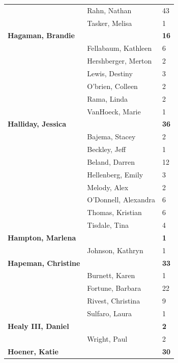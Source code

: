 \documentclass{article}\usepackage[]{graphicx}\usepackage[]{color}
\begin{document}
{\begin{longtable} { >{\raggedright}p{}|p{}p{}}
   \rowcolor[gray]{0.90} & Rahn, Nathan & 43 \\ 
   & Tasker, Melisa & 1 \\ 
  \textbf{Hagaman, Brandie} &  & \hspace{2cm}\textbf{16} \\ 
   & Fellabaum, Kathleen & 6 \\ 
   \rowcolor[gray]{0.90} & Hershberger, Merton & 2 \\ 
   \rowcolor[gray]{0.90} & Lewis, Destiny & 3 \\ 
   \rowcolor[gray]{0.90} & O'brien, Colleen & 2 \\ 
   & Rama, Linda & 2 \\ 
   & VanHoeck, Marie & 1 \\ 
  \textbf{Halliday, Jessica} &  & \hspace{2cm}\textbf{36} \\ 
   \rowcolor[gray]{0.90} & Bajema, Stacey & 2 \\ 
   \rowcolor[gray]{0.90} & Beckley, Jeff & 1 \\ 
   \rowcolor[gray]{0.90} & Beland, Darren & 12 \\ 
   & Hellenberg, Emily & 3 \\ 
   & Melody, Alex & 2 \\ 
   & O'Donnell, Alexandra & 6 \\ 
   \rowcolor[gray]{0.90} & Thomas, Kristian & 6 \\ 
   \rowcolor[gray]{0.90} & Tisdale, Tina & 4 \\ 
   \rowcolor[gray]{0.90}\textbf{Hampton, Marlena} &  & \hspace{2cm}\textbf{1} \\ 
   & Johnson, Kathryn & 1 \\ 
  \textbf{Hapeman, Christine} &  & \hspace{2cm}\textbf{33} \\ 
   & Burnett, Karen & 1 \\ 
   \rowcolor[gray]{0.90} & Fortune, Barbara & 22 \\ 
   \rowcolor[gray]{0.90} & Rivest, Christina & 9 \\ 
   \rowcolor[gray]{0.90} & Sulfaro, Laura & 1 \\ 
  \textbf{Healy III, Daniel} &  & \hspace{2cm}\textbf{2} \\ 
   & Wright, Paul & 2 \\ 
  \textbf{Hoener, Katie} &  & \hspace{2cm}\textbf{30} \\ 

\end{longtable}}
\end{document}
